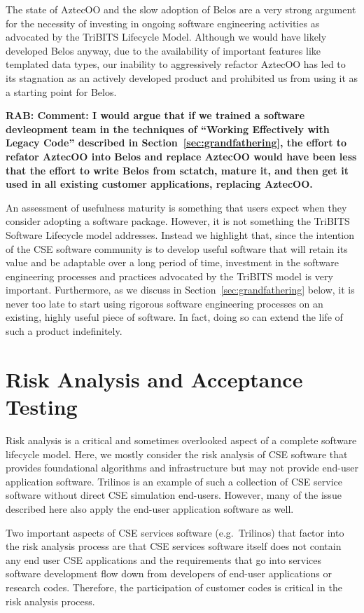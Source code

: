 \documentclass[11pt]{SANDreport}
\begin{document}
The state of AztecOO and the slow adoption of Belos are a very strong
argument for the necessity of investing in ongoing software
engineering activities as advocated by the TriBITS Lifecycle Model.
Although we would have likely developed Belos anyway, due to the
availability of important features like templated data types, our
inability to aggressively refactor AztecOO has led to its stagnation
as an actively developed product and prohibited us from using it as a
starting point for Belos.

{}\textbf{RAB: Comment: I would argue that if we trained a software
devleopment team in the techniques of ``Working Effectively with
Legacy Code'' described in Section~\ref{sec:grandfathering}, the
effort to refator AztecOO into Belos and replace AztecOO would have
been less that the effort to write Belos from sctatch, mature it, and
then get it used in all existing customer applications, replacing
AztecOO.}

An assessment of usefulness maturity is something that users expect
when they consider adopting a software package.  However, it is not
something the TriBITS Software Lifecycle model addresses.  Instead we
highlight that, since the intention of the CSE software community is
to develop useful software that will retain its value and be adaptable
over a long period of time, investment in the software engineering
processes and practices advocated by the TriBITS model is very
important.  Furthermore, as we discuss in
Section~\ref{sec:grandfathering} below, it is never too late to start
using rigorous software engineering processes on an existing, highly
useful piece of software.  In fact, doing so can extend the life of
such a product indefinitely.

%
{}\section{Risk Analysis and Acceptance Testing}
\label{sec:risk_analysis_acceptance_testing}
%

Risk analysis is a critical and sometimes overlooked aspect of a
complete software lifecycle model.  Here, we mostly consider the risk
analysis of CSE software that provides foundational algorithms and
infrastructure but may not provide end-user application software.
Trilinos is an example of such a collection of CSE service software
without direct CSE simulation end-users.  However, many of the issue
described here also apply the end-user application software as well.

Two important aspects of CSE services software (e.g.\ Trilinos) that
factor into the risk analysis process are that CSE services software
itself does not contain any end user CSE applications and the
requirements that go into services software development flow down from
developers of end-user applications or research codes.  Therefore, the
participation of customer codes is critical in the risk analysis
process.
\end{document}
